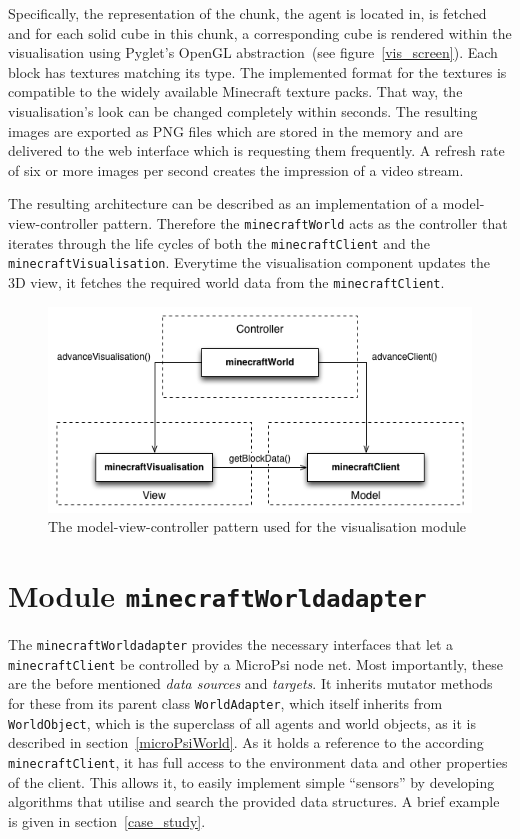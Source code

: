 Specifically, the representation of the chunk, the agent is located in, is fetched and for each solid cube in this chunk, a corresponding cube is rendered within the visualisation using Pyglet's OpenGL abstraction~(see figure~\ref{vis_screen}). Each block has textures matching its type. The implemented format for the textures is compatible to the widely available Minecraft texture packs. That way, the visualisation's look can be changed completely within seconds. The resulting images are exported as PNG files which are stored in the memory and are delivered to the web interface which is requesting them frequently. A refresh rate of six or more images per second creates the impression of a video stream.

The resulting architecture can be described as an implementation of a model-view-controller pattern. Therefore the \texttt{minecraftWorld} acts as the controller that iterates through the life cycles of both the \texttt{minecraftClient} and the \texttt{minecraftVisualisation}. Everytime the visualisation component updates the 3D view, it fetches the required world data from the \texttt{minecraftClient}.

\begin{figure}[h]
  \centering
    \includegraphics[width=12cm]{graphics/mvc}
  \caption{The model-view-controller pattern used for the visualisation module}
  \label{mvc}
\end{figure}

    \section{Module \texttt{minecraftWorldadapter}}


The \texttt{minecraftWorldadapter} provides the necessary interfaces that let a \texttt{minecraftClient} be controlled by a MicroPsi node net. Most importantly, these are the before mentioned \emph{data sources} and \emph{targets}. It inherits mutator methods for these from its parent class \texttt{WorldAdapter}, which itself inherits from \texttt{WorldObject}, which is the superclass of all agents and world objects, as it is described in section~\ref{microPsiWorld}. As it holds a reference to the according \texttt{minecraftClient}, it has full access to the environment data and other properties of the client. This allows it, to easily implement simple ``sensors'' by developing algorithms that utilise and search the provided data structures. A brief example is given in section~\ref{case_study}.
    
